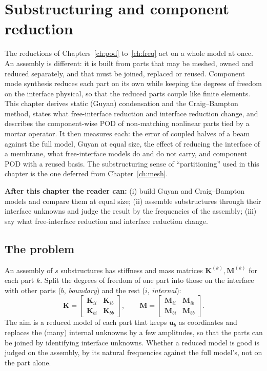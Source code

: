 \chapter{Substructuring and component reduction}\label{ch:cms}

\begin{tcolorbox}[colback=gray!5,colframe=gray!50,title={In this chapter}]
The reductions of Chapters~\ref{ch:pod} to~\ref{ch:freq} act on a whole model at once. An assembly is different: it is built from parts that may be meshed, owned and reduced separately, and that must be joined, replaced or reused. Component mode synthesis reduces each part on its own while keeping the degrees of freedom on the interface physical, so that the reduced parts couple like finite elements. This chapter derives static (Guyan) condensation and the Craig--Bampton method, states what free-interface reduction and interface reduction change, and describes the component-wise POD of non-matching nonlinear parts tied by a mortar operator. It then measures each: the error of coupled halves of a beam against the full model, Guyan at equal size, the effect of reducing the interface of a membrane, what free-interface models do and do not carry, and component POD with a reused basis. The substructuring sense of ``partitioning'' used in this chapter is the one deferred from Chapter~\ref{ch:mesh}.\par\smallskip
\textbf{After this chapter the reader can:} (i) build Guyan and Craig--Bampton models and compare them at equal size; (ii) assemble substructures through their interface unknowns and judge the result by the frequencies of the assembly; (iii) say what free-interface reduction and interface reduction change.
\end{tcolorbox}

\section{The problem}\label{sec:cm-problem}

An assembly of $s$ substructures has stiffness and mass matrices $\bm K^{(k)},\bm M^{(k)}$ for each part $k$. Split the degrees of freedom of one part into those on the interface with other parts ($b$, \emph{boundary}) and the rest ($i$, \emph{internal}):
\begin{equation}\label{eq:cm-split}
\bm K=\begin{bmatrix}\bm K_{ii}&\bm K_{ib}\\\bm K_{bi}&\bm K_{bb}\end{bmatrix},\qquad
\bm M=\begin{bmatrix}\bm M_{ii}&\bm M_{ib}\\\bm M_{bi}&\bm M_{bb}\end{bmatrix}.
\end{equation}
The aim is a reduced model of each part that keeps $\bm u_b$ as coordinates and replaces the (many) internal unknowns by a few amplitudes, so that the parts can be joined by identifying interface unknowns. Whether a reduced model is good is judged on the assembly, by its natural frequencies against the full model's, not on the part alone.

